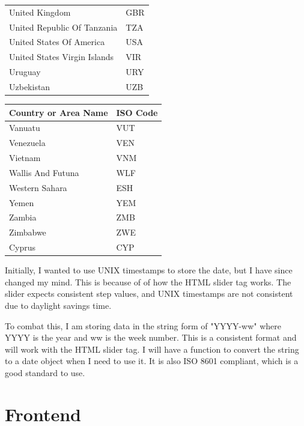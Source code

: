 \documentclass{report}
\begin{document}
\begin{center}
\begin{minipage}{0.46\textwidth}
\begin{tabular}{|p{10.5em}|p{6em}|}
            United Kingdom & GBR\\
            United Republic Of Tanzania & TZA\\
            United States Of America & USA\\
            United States Virgin Islands & VIR\\
            Uruguay & URY\\
            Uzbekistan & UZB\\
            \hline
        \end{tabular}
    \end{minipage}
    \hfill
    \begin{minipage}{0.46\textwidth}
        \begin{tabular}{|p{10.5em}|p{6em}|}
            \hline
            Country or Area Name & ISO Code\\
            \hline
            Vanuatu & VUT\\
            Venezuela & VEN\\
            Vietnam & VNM\\
            Wallis And Futuna & WLF\\
            Western Sahara & ESH\\
            Yemen & YEM\\
            Zambia & ZMB\\
            Zimbabwe & ZWE\\
            Cyprus & CYP\\
            \hline
        \end{tabular}
    \end{minipage}
\end{center}

\newpage

Initially, I wanted to use UNIX timestamps to store the date, but I have since changed my mind. This is because of of how the HTML slider tag works. The slider expects consistent step values, and UNIX timestamps are not consistent due to daylight savings time.

To combat this, I am storing data in the string form of "YYYY-ww" where YYYY is the year and ww is the week number. This is a consistent format and will work with the HTML slider tag. I will have a function to convert the string to a date object when I need to use it. It is also ISO 8601 compliant, which is a good standard to use.\\

\section{Frontend}
\end{document}
